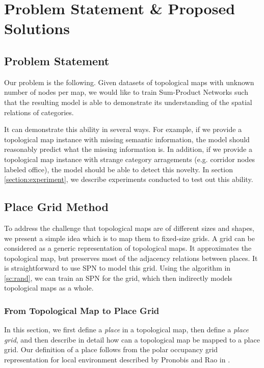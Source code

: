 \documentclass[10pt, titlepage]{article}
\theoremstyle{definition}
\begin{document}
\section{Problem Statement \& Proposed Solutions}\label{section:sol}
\subsection{Problem Statement}\label{section:problem}

Our problem is the following. Given datasets of topological maps with unknown number of nodes per map, we would like to train Sum-Product Networks such that the resulting model is able to demonstrate its understanding of the spatial relations of categories.

It can demonstrate this ability in several ways. For example, if we provide a topological map instance with missing semantic information, the model should reasonably predict what the missing information is. In addition, if we provide a topological map instance with strange category arragements (e.g. corridor nodes labeled office), the model should be able to detect this novelty. In section \ref{section:experiment}, we describe experiments conducted to test out this ability.

\subsection{Place Grid Method}\label{section:grid}
To address the challenge that topological maps are of different sizes and shapes, we present a simple idea which is to map them to fixed-size grids. A grid can be considered as a generic representation of topological maps. It approximates the topological map, but preserves most of the adjacency relations between places. It is straightforward to use SPN to model this grid. Using the algorithm in \ref{sc:rand}, we can train an SPN for the grid, which then indirectly models topological maps as a whole. 

\subsubsection{From Topological Map to Place Grid}

In this section, we first define a \textit{place} in a topological map, then define a \textit{place grid}, and then describe in detail how can a topological map be mapped to a place grid. Our definition of a place follows from the polar occupancy grid representation for local environment described by Pronobis and Rao in \cite{pronobis2016learning}.
\end{document}
